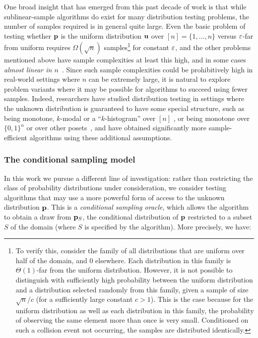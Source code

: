 One broad insight that has emerged from this past decade of work is that while sublinear-sample
algorithms do exist for many distribution testing problems, the number of samples required
is in general quite large.  Even the
basic problem of testing whether $\mathbf{p}$ is the uniform distribution $\mathbf{u}$
over $[n]=\{1,\dots,n\}$ versus $\varepsilon$-far from uniform
requires $\Omega(\sqrt{n})$ samples\footnote{To verify this, consider the
family of all distributions that are uniform over half of the domain, and $0$
elsewhere. Each distribution in this family is $\Theta(1)$-far from the uniform
distribution. However, it is not possible to distinguish with sufficiently high probability between
the uniform distribution and a distribution selected randomly from this family, given a
   sample of size $\sqrt{n}/c$ (for a sufficiently large constant $c>1$). This is the case
   because for the uniform distribution as well as each
   distribution in this family, the probability of observing the same element more than once
    is very small. Conditioned on such a collision event not occurring, the samples
    are distributed identically.}
 for constant $\varepsilon$, and the other problems mentioned above have sample complexities at least this high,
and in some cases \emph{almost linear in $n$}~\cite{RRSS:09,Valiant:11,ValiantValiant:11}.
Since such sample complexities could be prohibitively high in real-world settings where $n$ can be extremely large,  it is natural to explore problem variants  where it may be possible for algorithms to succeed
using fewer samples.  Indeed, researchers have studied distribution testing in settings where
the unknown distribution is guaranteed to have some special structure, such as being monotone, $k$-modal or a \mbox{``$k$-histogram''} over $[n]$
\cite{BKR:04,DDSVV:13,ILR:12}, or being monotone over $\{0,1\}^n$
\cite{RS:09} or over other posets~\cite{BFRV:11},
and have obtained significantly more sample-efficient algorithms using these additional assumptions.

\subsubsection{The conditional sampling model}

In this work we pursue a different line of investigation: rather than restricting the class of probability
distributions under consideration, we consider testing algorithms that may use a more powerful form of
access to the unknown distribution $\mathbf{p}$. This is a \emph{conditional sampling oracle}, which
allows the algorithm to obtain a draw from $\mathbf{p}_S$, the conditional distribution of $\mathbf{p}$
restricted to a subset $S$ of the domain (where $S$ is specified by the algorithm).  More
precisely, we have:


